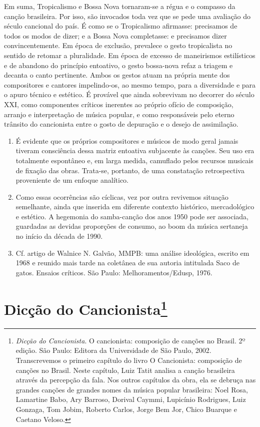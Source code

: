 Em suma, Tropicalismo e Bossa Nova tornaram-se a régua e o compasso da
canção brasileira. Por isso, são invocados toda vez que se pede uma
avaliação do século cancional do país. É como se o Tropicalismo
afirmasse: precisamos de todos os modos de dizer; e a Bossa Nova
completasse: e precisamos dizer convincentemente. Em época de exclusão,
prevalece o gesto tropicalista no sentido de retomar a pluralidade. Em
época de excesso de maneirismos estilísticos e de abandono do princípio
entoativo, o gesto bossa-nova refaz a triagem e decanta o canto
pertinente. Ambos os gestos atuam na própria mente dos compositores e
cantores impelindo-os, ao mesmo tempo, para a diversidade e para o apuro
técnico e estético. É provável que ainda sobrevivam no decorrer do
século XXI, como componentes críticos inerentes ao próprio ofício de
composição, arranjo e interpretação de música popular, e como
responsáveis pelo eterno trânsito do cancionista entre o gosto de
depuração e o desejo de assimilação.

\begin{enumerate}
\item É evidente que os próprios compositores e músicos de modo geral
jamais tiveram consciência dessa matriz entoativa subjacente às canções.
Seu uso era totalmente espontâneo e, em larga medida, camuflado pelos
recursos musicais de fixação das obras. Trata-se, portanto, de uma
constatação retrospectiva proveniente de um enfoque analítico.

\item Como essas ocorrências são cíclicas, vez por outra revivemos
situação semelhante, ainda que inserida em diferente contexto histórico,
mercadológico e estético. A hegemonia do samba-canção dos anos 1950 pode
ser associada, guardadas as devidas proporções de consumo, ao boom da
música sertaneja no início da década de 1990.

\item Cf. artigo de Walnice N. Galvão, MMPB: uma análise ideológica,
escrito em 1968 e reunido mais tarde na coletânea de sua autoria
intitulada Saco de gatos. Ensaios críticos. São Paulo:
Melhoramentos/Edusp, 1976.
\end{enumerate}

\chapter{Dicção do Cancionista\footnote{\emph{Dicção do Cancionista}. O cancionista: composição de canções no
Brasil. 2º edição. São Paulo: Editora da Universidade de São Paulo,
2002.\\
Transcrevemos o primeiro capítulo do livro O Cancionista:
composição de canções no Brasil. Neste capítulo, Luiz Tatit analisa a
canção brasileira através da percepção da fala. Nos outros capítulos da
obra, ela se debruça nas grandes canções de grandes nomes da música
popular brasileira: Noel Rosa, Lamartine Babo, Ary Barroso, Dorival
Caymmi, Lupicínio Rodrigues, Luiz Gonzaga, Tom Jobim, Roberto Carlos,
Jorge Bem Jor, Chico Buarque e Caetano Veloso.}}



